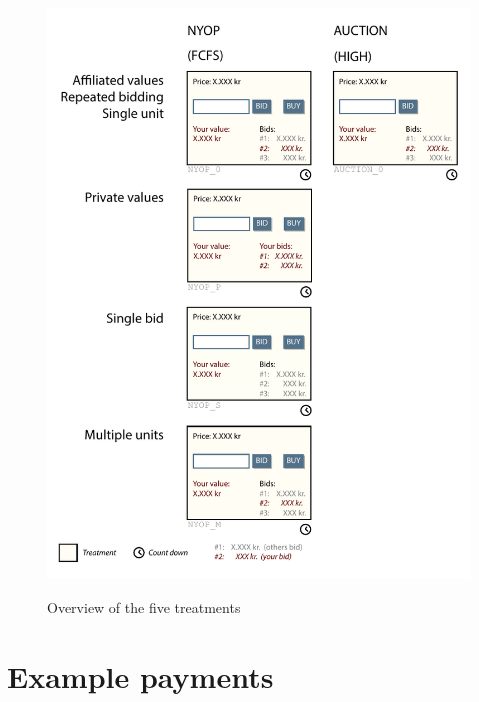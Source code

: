 \documentclass[a4paper,12pt]{article}
\begin{document}
	\begin{figure}
	        \centering
	        \caption{Overview of the five treatments}
	        \includegraphics[width=\textwidth]{Figures/Treatments}
			\label{fig:treatments}
	\end{figure}
	
	\section{Example payments}
	\label{app:example_payment}
\end{document}
